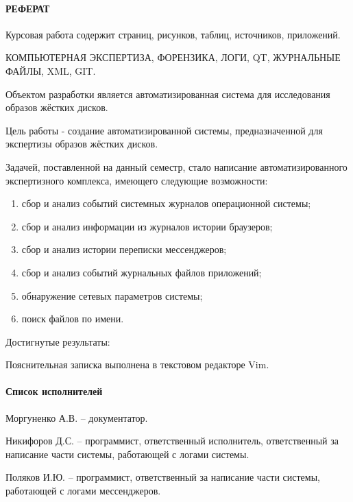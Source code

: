 \documentclass[russian,utf8,14pt,simple]{eskdtext}
\begin{document}
\newpage
{}
\paragraph{\hfill РЕФЕРАТ \hfill}
Курсовая работа содержит  страниц,  рисунков,  таблиц,  источников,  приложений.

КОМПЬЮТЕРНАЯ ЭКСПЕРТИЗА, ФОРЕНЗИКА, ЛОГИ, QT, ЖУРНАЛЬНЫЕ ФАЙЛЫ, XML, GIT.

Объектом разработки является автоматизированная система для исследования образов жёстких дисков.

Цель работы - создание автоматизированной системы, предназначенной для экспертизы образов жёстких дисков.

Задачей, поставленной на данный семестр, стало написание автоматизированного экспертизного комплекса, имеющего следующие возможности: 

\begin{enumerate}
\item сбор и анализ событий системных журналов операционной системы;
\item сбор и анализ информации из журналов истории браузеров;
\item сбор и анализ истории переписки мессенджеров;
\item сбор и анализ событий журнальных файлов приложений;
\item обнаружение сетевых параметров системы;
\item поиск файлов по имени.
\end{enumerate}

Достигнутые результаты:%

Пояснительная записка выполнена в текстовом редакторе Vim.

\newpage
{}
\paragraph{\hfill Список исполнителей \hfill}
Моргуненко А.В. -- документатор.

Никифоров Д.С. -- программист, ответственный исполнитель, ответственный за написание части системы, работающей с логами системы.

Поляков И.Ю. -- программист, ответственный за написание части системы, работающей с логами мессенджеров.
\end{document}
